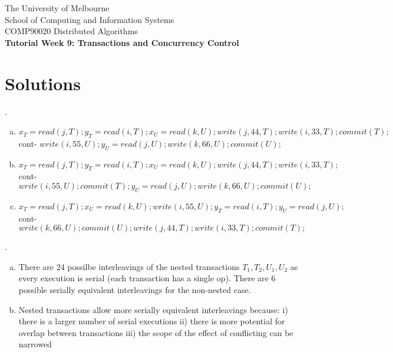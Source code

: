 \documentclass[12pt]{article}
\newcounter{question}
\newcommand{\question}[1]{
    \stepcounter{question}
    \thequestion. #1 \hfill
}
\begin{document}
\begin{center}
    {\sc The University of Melbourne
        \\
        School of Computing and Information Systems
        \\
    COMP90020 Distributed Algorithms}
    \bigskip \\
    {\Large\bf Tutorial Week 9: Transactions and Concurrency Control}
    \bigskip \\
\end{center}

\section*{Solutions}

\setcounter{question}{41}

\question{}


\begin{enumerate}[(a)]
    \item $x_T=read(j,T);y_T=read(i,T);x_U=read(k,U);write(j,44,T);write(i,33,T);commit(T);$ cont- $write(i,55,U);y_U=read(j,U);write(k,66,U);commit(U);$
    \item $x_T=read(j,T);y_T=read(i,T);x_U=read(k,U);write(j,44,T);write(i,33,T);$ cont- $write(i,55,U);commit(T);y_U=read(j,U);write(k,66,U);commit(U);$
    \item $x_T=read(j,T);x_U=read(k,U);write(i,55,U);y_T=read(i,T);y_U=read(j,U);$ cont- $write(k,66,U);commit(U);write(j,44,T);write(i,33,T);commit(T);$
\end{enumerate}

\bigskip

\question{}


\begin{enumerate}[(a)]
    \item There are 24 possilbe interleavings of the nested transactions $T_1,T_2,U_1,U_2$ as every execution is serial (each transaction has a single op). There are 6 possible serially equivalent interleavings for the non-nested case.
    \item Nested transactions allow more serially equivalent interleavings because: i) there is a larger number of serial executions ii) there is more potential for overlap between transactions iii) the scope of the effect of conflicting can be narrowed
\end{enumerate}
\end{document}
